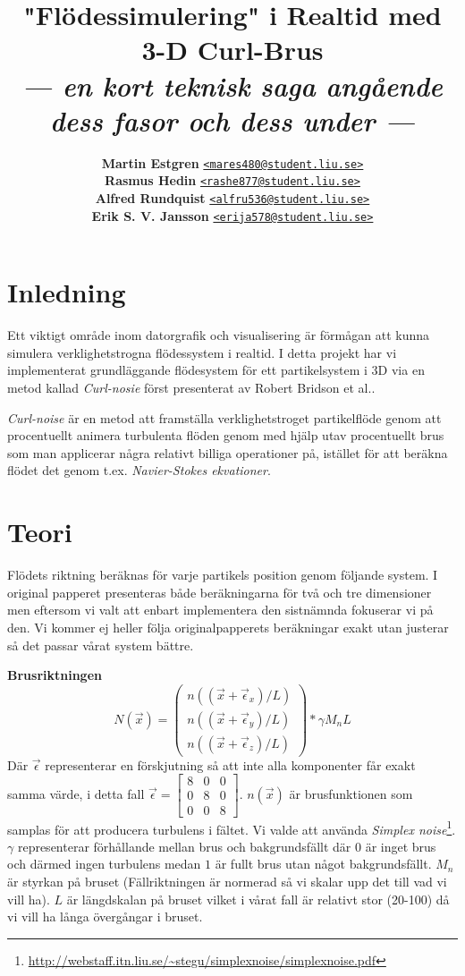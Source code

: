 \documentclass[a4paper]{article}
\title{\vspace{-2.5cm}\textbf{"Flödessimulering" i Realtid med 3-D Curl-Brus}\\
       \Large{\textit{--- en kort teknisk saga angående dess fasor och dess under ---}}}
\author{{\textbf{Martin Estgren}}\;\;\;\;\;\; {\href{mailto:mares480@student.liu.se}{\texttt{<mares480@student.liu.se>}}}\\
        {\textbf{Rasmus Hedin}}\;\;\;\;\;\;\;\; {\href{mailto:rashe877@student.liu.se}{\texttt{<rashe877@student.liu.se>}}}\\
        {\textbf{Alfred Rundquist}}\;\;\; {\href{mailto:alfru536@student.liu.se}{\texttt{<alfru536@student.liu.se>}}}\\
        {\textbf{Erik S. V. Jansson}}\; {\href{mailto:erija578@student.liu.se}{\texttt{<erija578@student.liu.se>}}}}
\begin{document}
    \maketitle

    \section{Inledning}

    Ett viktigt område inom datorgrafik och visualisering är förmågan att kunna simulera verklighetstrogna flödessystem i realtid. I detta projekt har vi implementerat grundläggande flödesystem för ett partikelsystem i 3D via en metod kallad \textit{Curl-nosie} först presenterat av Robert Bridson et al.\cite{bridson2007curl}.

    \textit{Curl-noise} är en metod att framställa verklighetstroget partikelflöde genom att procentuellt animera turbulenta flöden genom med hjälp utav procentuellt brus som man applicerar några relativt billiga operationer på, istället för att beräkna flödet det genom t.ex. \textit{Navier-Stokes ekvationer}. 

    \section{Teori}

    Flödets riktning beräknas för varje partikels position genom följande system. I original papperet presenteras både beräkningarna för två och tre dimensioner men eftersom vi valt att enbart implementera den sistnämnda fokuserar vi på den. Vi kommer ej heller följa originalpapperets beräkningar exakt utan justerar så det passar vårat system bättre.

    \textbf{Brusriktningen}
    \begin{equation}
   N(\vec{x}) =  
        \begin{pmatrix}
        n((\vec{x} + \vec{\epsilon}_x)/L)
        \\
        n((\vec{x} + \vec{\epsilon}_y)/L)
        \\ 
        n((\vec{x} + \vec{\epsilon}_z)/L)
        \end{pmatrix} * \gamma M_nL
    \end{equation}
    Där $\vec{\epsilon}$ representerar en förskjutning så att inte alla komponenter får exakt samma värde, i detta fall $\vec{\epsilon} = \begin{bmatrix}
8 & 0 & 0\\ 
0 & 8 & 0\\ 
0 & 0 & 8
\end{bmatrix}$. $n(\vec{x})$ är brusfunktionen som samplas för att producera turbulens i fältet. Vi valde att använda \textit{Simplex noise}\footnote{\url{http://webstaff.itn.liu.se/~stegu/simplexnoise/simplexnoise.pdf}}. $\gamma$ representerar förhållande mellan brus och bakgrundsfällt där $0$ är inget brus och därmed ingen turbulens medan $1$ är fullt brus utan något bakgrundsfällt. $M_n$ är styrkan på bruset (Fällriktningen är normerad så vi skalar upp det till vad vi vill ha). $L$ är längdskalan på bruset vilket i vårat fall är relativt stor (20-100) då vi vill ha långa övergångar i bruset.
\end{document}
